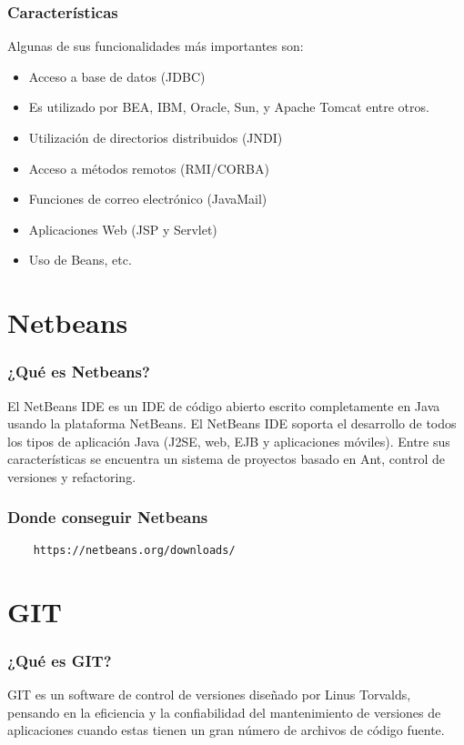 \documentclass{beamer}
\begin{document}
\begin{frame}
  \frametitle{Características}
    Algunas de sus funcionalidades más importantes son:
  \begin{itemize}
    \item Acceso a base de datos (JDBC)
    \item Es utilizado por BEA, IBM, Oracle, Sun, y Apache Tomcat entre otros.
    \item Utilización de directorios distribuidos (JNDI)
    \item Acceso a métodos remotos (RMI/CORBA)
    \item Funciones de correo electrónico (JavaMail)
    \item Aplicaciones Web (JSP y Servlet)
    \item Uso de Beans, etc.
  \end{itemize}
\end{frame}

\section{Netbeans}

\begin{frame}
  \frametitle{¿Qué es Netbeans?}
  El NetBeans IDE es un IDE de código abierto escrito completamente en Java
  usando la plataforma NetBeans. El NetBeans IDE soporta el desarrollo de todos
  los tipos de aplicación Java (J2SE, web, EJB y aplicaciones móviles). Entre
  sus características se encuentra un sistema de proyectos basado en Ant,
  control de versiones y refactoring.
\end{frame}


\begin{frame}[fragile]
  \frametitle{Donde conseguir Netbeans}
  \begin{verbatim}
    https://netbeans.org/downloads/
  \end{verbatim}
\end{frame}

\section{GIT}

\begin{frame}
  \frametitle{¿Qué es GIT?}
  GIT es un software de control de versiones diseñado por Linus Torvalds,
  pensando en la eficiencia y la confiabilidad del mantenimiento de versiones de
  aplicaciones cuando estas tienen un gran número de archivos de código fuente.
\end{frame}
\end{document}
